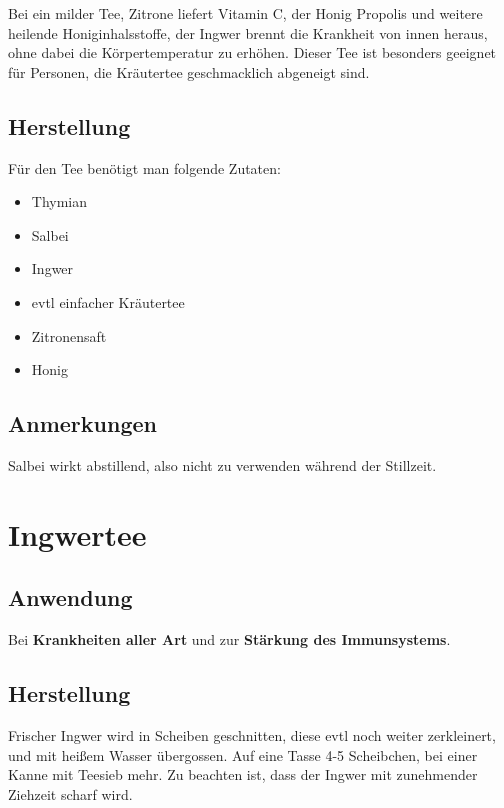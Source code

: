 Bei  ein milder Tee, Zitrone liefert Vitamin C, der Honig Propolis und weitere heilende Honiginhalsstoffe, der Ingwer brennt die Krankheit von innen heraus, ohne dabei die Körpertemperatur zu erhöhen. Dieser Tee ist besonders geeignet für Personen, die Kräutertee geschmacklich abgeneigt sind.

\subsection{Herstellung}

Für den Tee benötigt man folgende Zutaten:

\begin{itemize}
	\item Thymian
	\item Salbei
	\item Ingwer
	\item evtl einfacher Kräutertee
	\item Zitronensaft
	\item Honig
\end{itemize}


\subsection{Anmerkungen}

Salbei wirkt abstillend, also nicht zu verwenden während der Stillzeit.




\section{Ingwertee}

\subsection{Anwendung}

Bei \textbf{Krankheiten aller Art} und zur \textbf{Stärkung des Immunsystems}.

\subsection{Herstellung}

Frischer Ingwer wird in Scheiben geschnitten, diese evtl noch weiter zerkleinert, und mit heißem Wasser übergossen. Auf eine Tasse 4-5 Scheibchen, bei einer Kanne mit Teesieb mehr. Zu beachten ist, dass der Ingwer mit zunehmender Ziehzeit scharf wird.

